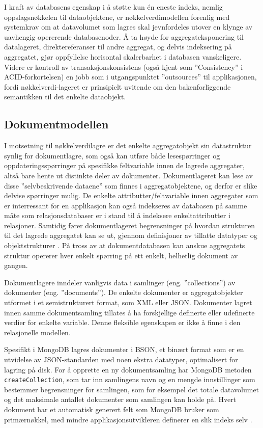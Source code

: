 I kraft av databasens egenskap i å støtte kun én eneste indeks, nemlig oppslagsnøkkelen til dataobjektene, er nøkkel\-verdi\-modellen forenlig med systemkrav om at datavolumet som lagres skal jevnfordeles utover en klynge av uavhengig opererende databasenoder. Å ta høyde for aggregateksponering til datalageret, direktereferanser til andre aggregat, og delvis indeksering på aggregatet, gjør oppfyllelse horisontal skalerbarhet i databasen vanskeligere. Videre er kontroll av transaksjonskonsistens (også kjent som ''Consistency'' i ACID-forkortelsen) en jobb som i utgangspunktet ''outsources'' til applikasjonen, fordi nøkkelverdi-lageret er prinsipielt uvitende om den bakenforliggende semantikken til det enkelte dataobjekt.

\subsection{Dokumentmodellen}

I motsetning til nøkkelverdilagre er det enkelte aggregatobjekt sin datastruktur synlig for dokumentlagre, som også kan utføre både lesespørringer og oppdateringsspørringer på spesifikke feltvariable innen de lagrede aggregater, altså bare hente ut distinkte deler av dokumenter. Dokumentlageret kan lese av disse ''selvbeskrivende dataene'' \citep{sadalage2013, elmasri2014} som finnes i aggregatobjektene, og derfor er slike delvise spørringer mulig. De enkelte attributter/feltvariable innen aggregater som er interressant for en applikasjon kan også indekseres av databasen på samme måte som relasjonsdatabaser er i stand til å indeksere enkeltattributter i relasjoner. Samtidig fører dokumentlageret begrensninger på hvordan strukturen til det lagrede aggregatet kan se ut, gjennom definisjoner av tillatte datatyper og objektstrukturer \citep{sadalage2013}. På tross av at dokumentdatabasen kan anskue aggregatets struktur opererer hver enkelt spørring på ett enkelt, helhetlig dokument av gangen.

Dokumentlagere inndeler vanligvis data i samlinger (eng. ''collections'') av dokumenter (eng. ''documents''). De enkelte dokumenter er aggregatobjekter utformet i et semistrukturert format, som XML eller JSON. Dokumenter lagret innen samme dokumentsamling tillates å ha forskjellige definerte eller udefinerte verdier for enkelte variable. Denne fleksible egenskapen er ikke å finne i den relasjonelle modellen.

Spesifikt i MongoDB lagres dokumenter i BSON, et binært format som er en utvidelse av JSON-standarden med noen ekstra datatyper, optimalisert for lagring på disk. For å opprette en ny dokumentsamling har MongoDB metoden \texttt{createCollection}, som tar inn samlingens navn og en mengde innstillinger som bestemmer begrensninger for samlingen, som for eksempel det totale datavolumet og det maksimale antallet dokumenter som samlingen kan holde på. Hvert dokument har et automatisk generert felt som MongoDB bruker som primærnøkkel, med mindre applikasjonsutvikleren definerer en slik indeks selv \citep{elmasri2014}.

